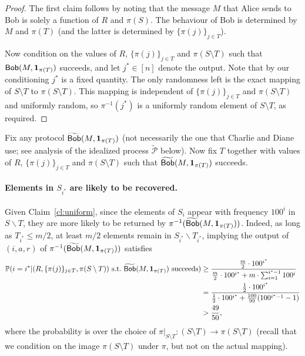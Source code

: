  \begin{proof}
The first claim follows by noting that the message $M$ that Alice sends to Bob is solely a function of $R$ and $\pi(S)$. The behaviour of Bob is determined by $M$ and $\pi(T)$ (and the latter is determined by $\{\pi(j)\}_{j\in T}$).

Now condition on the values of $R$, $\{\pi(j)\}_{j\in T}$ and $\pi(S\setminus T)$ such that  $\mathsf{Bob}(M, \mathbf{1}_{\pi(T)})$ succeeds, and let $j^*\in [n]$ denote the output. Note that by our conditioning $j^*$ is a fixed quantity. The only randomness left is the exact mapping of $S\setminus T$ to $\pi(S\setminus T)$. This mapping is independent of $\{\pi(j)\}_{j\in T}$ and $\pi(S\setminus T)$ and uniformly random, so $\pi^{-1}(j^*)$ is a uniformly random element of $S\setminus T$, as required.
\end{proof}
\fi 
Fix any protocol $\widetilde{\mathsf{Bob}}(M, \mathbf{1}_{\pi(T)})$ (not necessarily the one that Charlie and Diane use; see analysis of the idealized process $\widetilde{\mathcal{P}}$ below). Now fix $T$ together with values of $R$, $\{\pi(j)\}_{j\in T}$ and $\pi(S\setminus T)$ such that  $\widetilde{\mathsf{Bob}}(M, \mathbf{1}_{\pi(T)})$ succeeds.  

\paragraph{Elements in $S_{i^*}$ are likely to be recovered.}   Given Claim~\ref{cl:uniform}, since the elements of $S_i$ appear with frequency $100^i$ in $S\backslash T$, they are more likely to be returned by $\pi^{-1}(\widetilde{\mathsf{Bob}}(M, \mathbf{1}_{\pi(T)}))$. Indeed, as long as $T_{i^*}\le m/2$, at least $m/2$ elements remain in $S_{i^*}\backslash T_{i^*}$, implying the output of $(i, a, r)$ of $\pi^{-1}(\widetilde{\mathsf{Bob}}(M, \mathbf{1}_{\pi(T)}))$ satisfies
\begin{equation}
\begin{split}
\Pr(i = i^* | (R, \{\pi(j)\}_{j\in T}, \pi(S\setminus T)) \text{~s.t.~}\widetilde{\query}(M, \mathbf{1}_{\pi(T)})\text{~succeeds}) &\ge \frac{\frac m2\cdot 100^{i^*}}{\frac m2\cdot 100^{i^*} + m\cdot \sum_{i=1}^{i^*-1} 100^i}\\
& = \frac{\frac 12\cdot 100^{i^*}}{\frac 12\cdot 100^{i^*} + \frac {100}{99}(100^{i^*-1} - 1)}\\
& > \frac{49}{50} , \label{eqn:istar-likely}
\end{split}
\end{equation}
where the probability is over the choice of $\pi|_{S\setminus T}:(S\setminus T)\to \pi(S\setminus T)$ (recall that we condition on the image $\pi(S\setminus T)$ under $\pi$, but not on the actual mapping).
\fi


